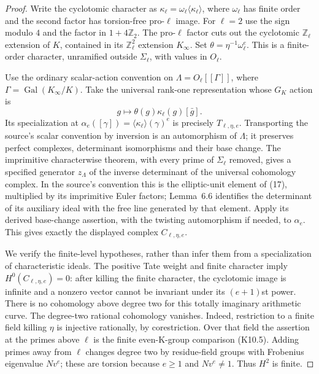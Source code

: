 \begin{proof}
Write the cyclotomic character as
$\kappa_\ell=\omega_\ell\langle\kappa_\ell\rangle$,
where $\omega_\ell$ has finite order and the second
factor has torsion-free pro-$\ell$ image.
For $\ell=2$ use the sign modulo $4$ and the factor
in $1+4\mathbb Z_2$.
The pro-$\ell$ factor cuts out the cyclotomic
$\mathbb Z_\ell$ extension of $K$, contained in its
$\mathbb Z_\ell^2$ extension $K_\infty$.
Set $\theta=\eta^{-1}\omega_\ell^e$.
This is a finite-order character, unramified outside
$\Sigma_\ell$, with values in $O_\ell$.

Use the ordinary scalar-action convention on
$\Lambda=O_\ell[[\Gamma]]$, where
$\Gamma=\operatorname{Gal}(K_\infty/K)$.
Take the universal rank-one representation whose
$G_K$ action is
\[
         g\longmapsto \theta(g)\kappa_\ell(g)[\bar g].
                                                            \tag{EU.5}
\]
Its specialization at
$\alpha_e([\gamma])=\langle\kappa_\ell\rangle(\gamma)^e$
is precisely $T_{\ell,\eta,e}$.
Transporting the source's scalar convention by inversion
is an automorphism of $\Lambda$; it preserves perfect
complexes, determinant isomorphisms and their base change.
The imprimitive characterwise theorem, with every prime
of $\Sigma_\ell$ removed, gives a specified generator
$z_\Lambda$ of the inverse determinant of the universal
cohomology complex.  In the source's convention this is
the elliptic-unit element of (17), multiplied by its
imprimitive Euler factors; Lemma~6.6 identifies the
determinant of its auxiliary ideal with the free line
generated by that element.
Apply its derived base-change assertion, with the
twisting automorphism if needed, to $\alpha_e$.
This gives exactly the displayed complex $C_{\ell,\eta,e}$.

We verify the finite-level hypotheses, rather than
infer them from a specialization of characteristic ideals.
The positive Tate weight and finite character imply
$H^0(C_{\ell,\eta,e})=0$: after killing the finite
character, the cyclotomic image is infinite and a
nonzero vector cannot be invariant under its
$(e+1)$st power.  There is no cohomology above degree
two for this totally imaginary arithmetic curve.
The degree-two rational cohomology vanishes.
Indeed, restriction to a finite field killing $\eta$
is injective rationally, by corestriction.  Over that
field the assertion at the primes above $\ell$ is
the finite even-K-group comparison (K10.5).
Adding primes away from $\ell$ changes degree two
by residue-field groups with Frobenius eigenvalue
$Nv^e$; these are torsion because $e\geq1$ and
$Nv^e\ne1$.  Thus $H^2$ is finite.


\end{proof}
